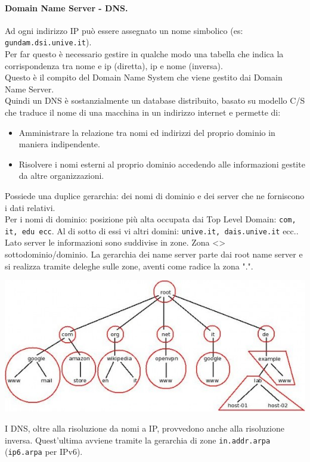 \documentclass[a4paper]{report}
\begin{document}
\paragraph{Domain Name Server - DNS.} Ad ogni indirizzo IP può essere assegnato un
nome simbolico (es: \texttt{gundam.dsi.unive.it}).\\
Per far questo è necessario gestire in qualche
modo una tabella che indica la corrispondenza
tra nome e ip (diretta), ip e nome (inversa).\\
Questo è il compito del Domain Name System
che viene gestito dai Domain Name Server.\\
Quindi un DNS è sostanzialmente un database
distribuito, basato su modello C/S che
traduce il nome di una macchina in un
indirizzo internet e permette di:
\begin{itemize}
\item Amministrare la relazione tra nomi ed indirizzi del
proprio dominio in maniera indipendente.
\item Risolvere i nomi esterni al proprio dominio
accedendo alle informazioni gestite da altre
organizzazioni.
\end{itemize}
Possiede una duplice gerarchia: dei nomi di dominio e dei server che ne forniscono i dati relativi.	\\
Per i nomi di dominio: posizione più alta occupata dai
Top Level Domain: \texttt{com, it, edu ecc}. Al di sotto di essi vi
altri domini: \texttt{unive.it, dais.unive.it} ecc..\\
Lato server le informazioni sono suddivise in zone. Zona
<> sottodominio/dominio. La gerarchia dei name server
parte dai root name server e si realizza tramite deleghe
sulle zone, aventi come radice la zona ".".\\
\begin{center}
\includegraphics[scale=0.6]{dns.png}
\end{center}
I DNS, oltre alla risoluzione da nomi a IP, provvedono anche alla risoluzione inversa. Quest'ultima avviene tramite la gerarchia di zone \texttt{in.addr.arpa} (\texttt{ip6.arpa} per IPv6).\\
\end{document}
